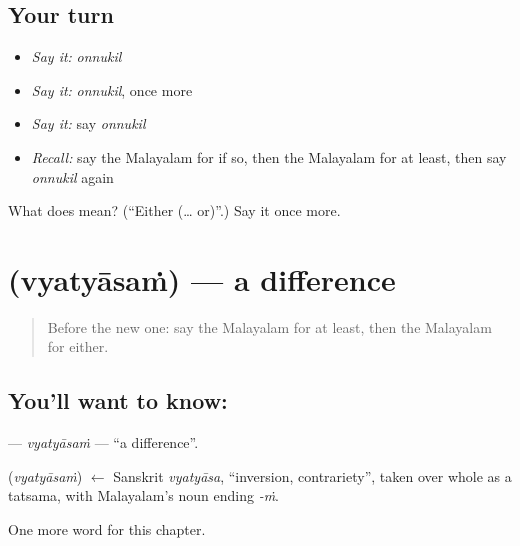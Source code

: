 \subsection*{Your turn}
\begin{itemize}
\raggedright
  \item \emph{Say it:} \emph{onnukil}
  \item \emph{Say it:} \emph{onnukil}, once more
  \item \emph{Say it:} say \emph{onnukil}
  \item \emph{Recall:} say the Malayalam for if so, then the Malayalam for at least, then say \emph{onnukil} again
\end{itemize}

\begin{tcolorbox}[breakable,colback=teal!4,colframe=teal!35!black,title={Before you move on}]
What does  mean? (\textquotedblleft{}Either (… or)\textquotedblright{}.) Say it once more.
\end{tcolorbox}
\section[\texorpdfstring{\ml{വ്യത്യാസം} (vyatyāsaṁ)}{വ്യത്യാസം (vyatyāsaṁ)}]{ (vyatyāsaṁ) — a difference}

\label{lesson:ML-C242-vyatyasam}



\begin{quote}
Before the new one: say the Malayalam for at least, then the Malayalam for either.
\end{quote}

\subsection*{You'll want to know: }
\textbf{} — \emph{vyatyāsaṁ} — \textquotedblleft{}a difference\textquotedblright{}.

\begin{cousinweb}
\textbf{} (\emph{vyatyāsaṁ}) $\leftarrow$ Sanskrit \emph{vyatyāsa}, \textquotedblleft{}inversion, contrariety\textquotedblright{}, taken over whole as a tatsama, with Malayalam's noun ending \emph{-ṁ}.
\end{cousinweb}

\begin{grammarlens}[title={What you've built}]
One more word for this chapter.
\end{grammarlens}

